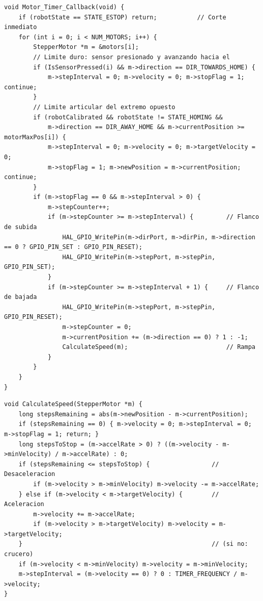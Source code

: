 \begin{lstlisting}[caption={Generación de pasos en la ISR de TIM2 (\texttt{motor\_driver.c}).}]
void Motor_Timer_Callback(void) {
    if (robotState == STATE_ESTOP) return;           // Corte inmediato
    for (int i = 0; i < NUM_MOTORS; i++) {
        StepperMotor *m = &motors[i];
        // Limite duro: sensor presionado y avanzando hacia el
        if (IsSensorPressed(i) && m->direction == DIR_TOWARDS_HOME) {
            m->stepInterval = 0; m->velocity = 0; m->stopFlag = 1; continue;
        }
        // Limite articular del extremo opuesto
        if (robotCalibrated && robotState != STATE_HOMING &&
            m->direction == DIR_AWAY_HOME && m->currentPosition >= motorMaxPos[i]) {
            m->stepInterval = 0; m->velocity = 0; m->targetVelocity = 0;
            m->stopFlag = 1; m->newPosition = m->currentPosition; continue;
        }
        if (m->stopFlag == 0 && m->stepInterval > 0) {
            m->stepCounter++;
            if (m->stepCounter >= m->stepInterval) {         // Flanco de subida
                HAL_GPIO_WritePin(m->dirPort, m->dirPin, m->direction == 0 ? GPIO_PIN_SET : GPIO_PIN_RESET);
                HAL_GPIO_WritePin(m->stepPort, m->stepPin, GPIO_PIN_SET);
            }
            if (m->stepCounter >= m->stepInterval + 1) {     // Flanco de bajada
                HAL_GPIO_WritePin(m->stepPort, m->stepPin, GPIO_PIN_RESET);
                m->stepCounter = 0;
                m->currentPosition += (m->direction == 0) ? 1 : -1;
                CalculateSpeed(m);                           // Rampa
            }
        }
    }
}
\end{lstlisting}

\begin{lstlisting}[caption={Perfil trapezoidal (\texttt{motor\_driver.c}).}]
void CalculateSpeed(StepperMotor *m) {
    long stepsRemaining = abs(m->newPosition - m->currentPosition);
    if (stepsRemaining == 0) { m->velocity = 0; m->stepInterval = 0; m->stopFlag = 1; return; }
    long stepsToStop = (m->accelRate > 0) ? ((m->velocity - m->minVelocity) / m->accelRate) : 0;
    if (stepsRemaining <= stepsToStop) {                 // Desaceleracion
        if (m->velocity > m->minVelocity) m->velocity -= m->accelRate;
    } else if (m->velocity < m->targetVelocity) {        // Aceleracion
        m->velocity += m->accelRate;
        if (m->velocity > m->targetVelocity) m->velocity = m->targetVelocity;
    }                                                    // (si no: crucero)
    if (m->velocity < m->minVelocity) m->velocity = m->minVelocity;
    m->stepInterval = (m->velocity == 0) ? 0 : TIMER_FREQUENCY / m->velocity;
}
\end{lstlisting}

